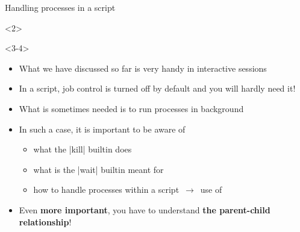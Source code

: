 \begin{frame}{Handling processes in a script}
    \vspace{-2mm}
    \begin{overlayarea}{\textwidth}{0.7\textheight}
        \begin{onlyenv}<2>
            \vspace{-5mm}
            \begin{center}
            \end{center}
        \end{onlyenv}
        \begin{onlyenv}<3-4>
            \begin{itemize}
                \item What we have discussed so far is very handy in interactive sessions
                \item In a script, job control is turned off by default and you will hardly need it!
                \item What is sometimes needed is to run processes in background
                \item In such a case, it is important to be aware of
                      \begin{itemize}
                          \item what the \bash|kill| builtin does
                          \item what is the \bash|wait| builtin meant for
                          \item how to handle processes within a script $\,\to\,$ use of \PB{\texttt{\$!}}
                      \end{itemize}
                \item<4> Even \textbf{more important}, you have to understand \alert{\textbf{the parent-child relationship}}!\\[4mm]

\end{itemize}
\end{onlyenv}
\end{overlayarea}
\end{frame}
